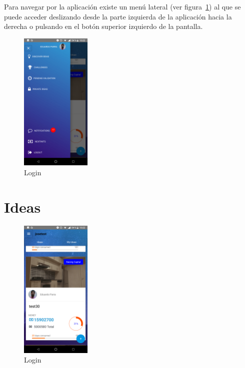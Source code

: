 Para navegar por la aplicación existe un menú lateral (ver figura~\ref{fig:menu_admin}) al que 
se puede acceder deslizando desde la parte izquierda de la aplicación hacia la derecha o pulsando 
en el botón superior izquierdo de la pantalla.

\begin{figure}[!h]
	\begin{center}
		\includegraphics[width=0.3\textwidth]{./img/anexo1/menu_admin.png}
		\caption{Login}
		\label{fig:menu_admin}
	\end{center}
\end{figure}

\section{Ideas}

\begin{figure}[!h]
	\begin{center}
		\includegraphics[width=0.3\textwidth]{./img/anexo1/inicio_mis_ideas.png}
		\caption{Login}
		\label{fig:inicio_mis_ideas}
	\end{center}
\end{figure}

